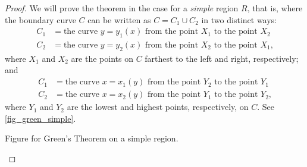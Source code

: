 \begin{proof}
 We will prove the theorem in the case for a \emph{simple} region $R$, that is, where the boundary curve $C$ can be written as $C = C_1 \cup C_2$ in two distinct ways:
 \begin{align}
  C_1 &= \text{the curve $y = y_1(x)$ from the point $X_1$ to the point $X_2$} \label{green_bottom}\\
  C_2 &= \text{the curve $y = y_2(x)$ from the point $X_2$ to the point $X_1$,}\label{green_top}
 \end{align}
 where $X_1$ and $X_2$ are the points on $C$ farthest to the left and right, respectively; and
 \begin{align}
  C_1 &= \text{the curve $x = x_1(y)$ from the point $Y_2$ to the point $Y_1$}\label{green_left}\\
  C_2 &= \text{the curve $x = x_2(y)$ from the point $Y_1$ to the point $Y_2$,}\label{green_right}
 \end{align}
 where $Y_1$ and $Y_2$ are the lowest and highest points, respectively, on $C$.
 See \autoref{fig_green_simple}.

 \begin{lxfigure}
 \begin{center}
 \caption{Figure for Green's Theorem on a simple region.}
 \label{fig_green_simple}
 \end{center}
 \end{lxfigure}


\end{proof}
